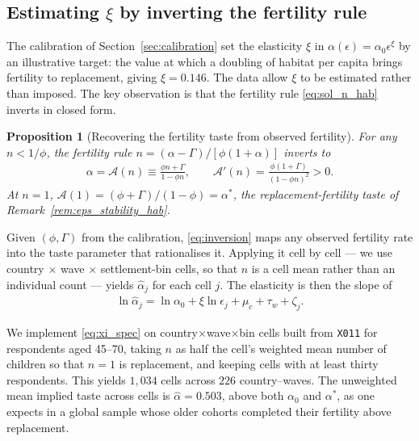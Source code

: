 \documentclass[11pt]{article}
\newtheorem{proposition}{Proposition}
\begin{document}
\subsection{Estimating $\xi$ by inverting the fertility rule}
\label{sub:xi}

The calibration of Section~\ref{sec:calibration} set the elasticity $\xi$ in
$\alpha(\epsilon)=\alpha_0\epsilon^{\xi}$ by an illustrative target: the value at which a doubling of
habitat per capita brings fertility to replacement, giving $\xi=0.146$. The data allow $\xi$ to be
estimated rather than imposed. The key observation is that the fertility rule
\eqref{eq:sol_n_hab} inverts in closed form.

\begin{proposition}[Recovering the fertility taste from observed fertility]
\label{prop:inversion}
For any $n<1/\phi$, the fertility rule $n=(\alpha-\Gamma)/[\phi(1+\alpha)]$ inverts to
\begin{align}
\alpha=\mathcal{A}(n)\equiv\frac{\phi n+\Gamma}{1-\phi n},
\qquad
\mathcal{A}'(n)=\frac{\phi(1+\Gamma)}{(1-\phi n)^{2}}>0 .
\label{eq:inversion}
\end{align}
At $n=1$, $\mathcal{A}(1)=(\phi+\Gamma)/(1-\phi)=\alpha^{\ast}$, the replacement-fertility taste of
Remark~\ref{rem:eps_stability_hab}.
\end{proposition}

Given $(\phi,\Gamma)$ from the calibration, \eqref{eq:inversion} maps any observed fertility rate
into the taste parameter that rationalises it. Applying it cell by cell --- we use country
$\times$ wave $\times$ settlement-bin cells, so that $n$ is a cell mean rather than an individual
count --- yields $\hat\alpha_{j}$ for each cell $j$. The elasticity is then the slope of
\begin{align}
\ln \hat\alpha_{j}=\ln\alpha_0+\xi \ln \epsilon_{j}+\mu_{c}+\tau_{w}+\zeta_{j}.
\label{eq:xi_spec}
\end{align}

We implement \eqref{eq:xi_spec} on country$\times$wave$\times$bin cells built from \texttt{X011}
for respondents aged 45--70, taking $n$ as half the cell's weighted mean number of children so that
$n=1$ is replacement, and keeping cells with at least thirty respondents. This yields $1{,}034$
cells across $226$ country--waves. The unweighted mean implied taste across cells is $\hat\alpha=0.503$, above both
$\alpha_0$ and $\alpha^{\ast}$, as one expects in a global sample whose older cohorts completed
their fertility above replacement.
\end{document}
